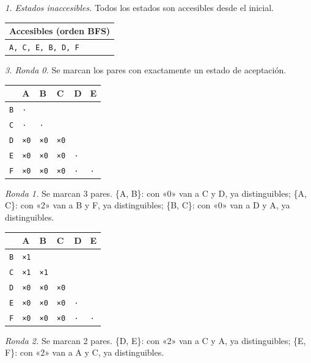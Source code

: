 \documentclass[11pt]{article}
\begin{document}
\textit{1. Estados inaccesibles.} Todos los estados son accesibles desde el inicial.
\begin{center}\footnotesize\begin{tabular}{l}\toprule
Accesibles (orden BFS) \\\midrule
\texttt{A, C, E, B, D, F} \\
\bottomrule\end{tabular}\end{center}
\textit{3. Ronda 0.} Se marcan los pares con exactamente un estado de aceptación.
\begin{center}\footnotesize\begin{tabular}{llllll}\toprule
 & A & B & C & D & E \\\midrule
\texttt{B} & \texttt{·} & \texttt{} & \texttt{} & \texttt{} & \texttt{} \\
\texttt{C} & \texttt{·} & \texttt{·} & \texttt{} & \texttt{} & \texttt{} \\
\texttt{D} & \texttt{×0} & \texttt{×0} & \texttt{×0} & \texttt{} & \texttt{} \\
\texttt{E} & \texttt{×0} & \texttt{×0} & \texttt{×0} & \texttt{·} & \texttt{} \\
\texttt{F} & \texttt{×0} & \texttt{×0} & \texttt{×0} & \texttt{·} & \texttt{·} \\
\bottomrule\end{tabular}\end{center}
\textit{Ronda 1.} Se marcan 3 pares. \{A, B\}: con «0» van a C y D, ya distinguibles; \{A, C\}: con «2» van a B y F, ya distinguibles; \{B, C\}: con «0» van a D y A, ya distinguibles.
\begin{center}\footnotesize\begin{tabular}{llllll}\toprule
 & A & B & C & D & E \\\midrule
\texttt{B} & \texttt{×1} & \texttt{} & \texttt{} & \texttt{} & \texttt{} \\
\texttt{C} & \texttt{×1} & \texttt{×1} & \texttt{} & \texttt{} & \texttt{} \\
\texttt{D} & \texttt{×0} & \texttt{×0} & \texttt{×0} & \texttt{} & \texttt{} \\
\texttt{E} & \texttt{×0} & \texttt{×0} & \texttt{×0} & \texttt{·} & \texttt{} \\
\texttt{F} & \texttt{×0} & \texttt{×0} & \texttt{×0} & \texttt{·} & \texttt{·} \\
\bottomrule\end{tabular}\end{center}
\textit{Ronda 2.} Se marcan 2 pares. \{D, E\}: con «2» van a C y A, ya distinguibles; \{E, F\}: con «2» van a A y C, ya distinguibles.
\end{document}
